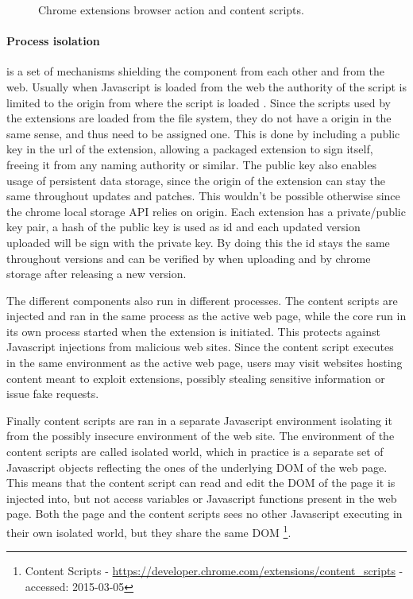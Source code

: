 \begin{figure}[ht]
    \caption{Chrome extensions browser action and content scripts.}
    \label{extension-ux}
\end{figure}

\paragraph{Process isolation} is a set of mechanisms shielding the component from each other and from the web. Usually when Javascript is loaded from the web the authority of the script is limited to the origin from where the script is loaded \cite{protecting-browsers}. Since the scripts used by the extensions are loaded from the file system, they do not have a origin in the same sense, and thus need to be assigned one. This is done by including a public key in the url of the extension, allowing a packaged extension to sign itself, freeing it from any naming authority or similar. The public key also enables usage of persistent data storage, since the origin of the extension can stay the same throughout updates and patches. This wouldn't be possible otherwise since the chrome local storage API relies on origin. Each extension has a private/public key pair, a hash of the public key is used as id and each updated version uploaded will be sign with the private key. By doing this the id stays the same throughout versions and can be verified by when uploading and by chrome storage after releasing a new version. 


\par The different components also run in different processes. The content scripts are injected and ran in the same process as the active web page, while the core run in its own process started when the extension is initiated. This protects against Javascript injections from malicious web sites\cite{javascript-injection}. Since the content script executes in the same environment as the active web page, users may visit websites hosting content meant to exploit extensions\cite{carlini-chrome}, possibly stealing sensitive information or issue fake requests.
\par Finally content scripts are ran in a separate Javascript environment isolating it from the possibly insecure environment of the web site. The environment of the content scripts are called isolated world, which in practice is a separate set of Javascript objects reflecting the ones of the underlying DOM of the web page. This means that the content script can read and edit the DOM of the page it is injected into, but not access variables or Javascript functions present in the web page. Both the page and the content scripts sees no other Javascript executing in their own isolated world, but they share the same DOM \footnote{Content Scripts - \url{https://developer.chrome.com/extensions/content_scripts} - accessed: 2015-03-05}.


